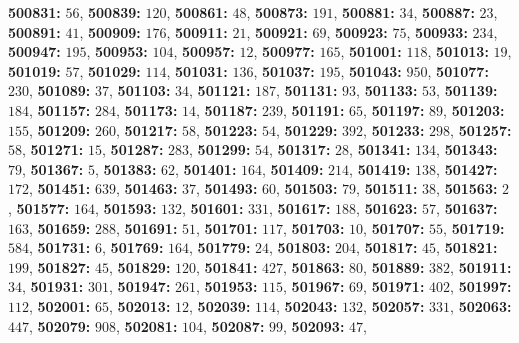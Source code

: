 \textsf{\bfseries 500831:} $56$, \textsf{\bfseries 500839:} $120$, \textsf{\bfseries 500861:} $48$, \textsf{\bfseries 500873:} $191$, \textsf{\bfseries 500881:} $34$, \textsf{\bfseries 500887:} $23$, \textsf{\bfseries 500891:} $41$, \textsf{\bfseries 500909:} $176$, \textsf{\bfseries 500911:} $21$, \textsf{\bfseries 500921:} $69$, \textsf{\bfseries 500923:} $75$, \textsf{\bfseries 500933:} $234$, \textsf{\bfseries 500947:} $195$, \textsf{\bfseries 500953:} $104$, \textsf{\bfseries 500957:} $12$, \textsf{\bfseries 500977:} $165$, \textsf{\bfseries 501001:} $118$, \textsf{\bfseries 501013:} $19$, \textsf{\bfseries 501019:} $57$, \textsf{\bfseries 501029:} $114$, \textsf{\bfseries 501031:} $136$, \textsf{\bfseries 501037:} $195$, \textsf{\bfseries 501043:} $950$, \textsf{\bfseries 501077:} $230$, \textsf{\bfseries 501089:} $37$, \textsf{\bfseries 501103:} $34$, \textsf{\bfseries 501121:} $187$, \textsf{\bfseries 501131:} $93$, \textsf{\bfseries 501133:} $53$, \textsf{\bfseries 501139:} $184$, \textsf{\bfseries 501157:} $284$, \textsf{\bfseries 501173:} $14$, \textsf{\bfseries 501187:} $239$, \textsf{\bfseries 501191:} $65$, \textsf{\bfseries 501197:} $89$, \textsf{\bfseries 501203:} $155$, \textsf{\bfseries 501209:} $260$, \textsf{\bfseries 501217:} $58$, \textsf{\bfseries 501223:} $54$, \textsf{\bfseries 501229:} $392$, \textsf{\bfseries 501233:} $298$, \textsf{\bfseries 501257:} $58$, \textsf{\bfseries 501271:} $15$, \textsf{\bfseries 501287:} $283$, \textsf{\bfseries 501299:} $54$, \textsf{\bfseries 501317:} $28$, \textsf{\bfseries 501341:} $134$, \textsf{\bfseries 501343:} $79$, \textsf{\bfseries 501367:} $5$, \textsf{\bfseries 501383:} $62$, \textsf{\bfseries 501401:} $164$, \textsf{\bfseries 501409:} $214$, \textsf{\bfseries 501419:} $138$, \textsf{\bfseries 501427:} $172$, \textsf{\bfseries 501451:} $639$, \textsf{\bfseries 501463:} $37$, \textsf{\bfseries 501493:} $60$, \textsf{\bfseries 501503:} $79$, \textsf{\bfseries 501511:} $38$, \textsf{\bfseries 501563:} $2$, \textsf{\bfseries 501577:} $164$, \textsf{\bfseries 501593:} $132$, \textsf{\bfseries 501601:} $331$, \textsf{\bfseries 501617:} $188$, \textsf{\bfseries 501623:} $57$, \textsf{\bfseries 501637:} $163$, \textsf{\bfseries 501659:} $288$, \textsf{\bfseries 501691:} $51$, \textsf{\bfseries 501701:} $117$, \textsf{\bfseries 501703:} $10$, \textsf{\bfseries 501707:} $55$, \textsf{\bfseries 501719:} $584$, \textsf{\bfseries 501731:} $6$, \textsf{\bfseries 501769:} $164$, \textsf{\bfseries 501779:} $24$, \textsf{\bfseries 501803:} $204$, \textsf{\bfseries 501817:} $45$, \textsf{\bfseries 501821:} $199$, \textsf{\bfseries 501827:} $45$, \textsf{\bfseries 501829:} $120$, \textsf{\bfseries 501841:} $427$, \textsf{\bfseries 501863:} $80$, \textsf{\bfseries 501889:} $382$, \textsf{\bfseries 501911:} $34$, \textsf{\bfseries 501931:} $301$, \textsf{\bfseries 501947:} $261$, \textsf{\bfseries 501953:} $115$, \textsf{\bfseries 501967:} $69$, \textsf{\bfseries 501971:} $402$, \textsf{\bfseries 501997:} $112$, \textsf{\bfseries 502001:} $65$, \textsf{\bfseries 502013:} $12$, \textsf{\bfseries 502039:} $114$, \textsf{\bfseries 502043:} $132$, \textsf{\bfseries 502057:} $331$, \textsf{\bfseries 502063:} $447$, \textsf{\bfseries 502079:} $908$, \textsf{\bfseries 502081:} $104$, \textsf{\bfseries 502087:} $99$, \textsf{\bfseries 502093:} $47$, 
